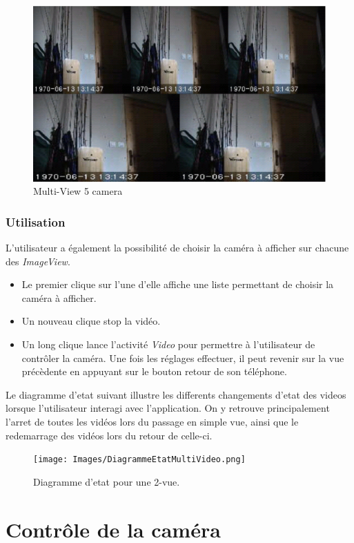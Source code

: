 \begin{figure}[H]
  \label{5cam.eps}
  \centering
   \includegraphics[scale=0.4]{Images/5cam.eps}
  \caption{Multi-View 5 camera}
\end{figure}  
\subsubsection{Utilisation}
L'utilisateur a également la possibilité de choisir la caméra à afficher sur chacune des \textit{ImageView}. 
\begin{itemize}
\item Le premier clique sur l'une d'elle affiche une liste permettant de
choisir la caméra à afficher.
\item Un nouveau clique stop la vidéo.
\item Un long clique lance l'activité \textit{Video} pour permettre à
l'utilisateur de contrôler la caméra. Une fois les réglages effectuer, il peut
revenir sur la vue précèdente en appuyant sur le bouton retour de son téléphone.
\end{itemize}
Le diagramme d'etat suivant illustre les differents changements d'etat des
videos lorsque l'utilisateur interagi avec l'application. On y retrouve
principalement l'arret de toutes les vidéos lors du passage en simple vue, ainsi
que le redemarrage des vidéos lors du retour de celle-ci.
\begin{figure}[H]
  \label{DiagrammeSequenceMultiView}
  \centering
   \texttt{[image: Images/DiagrammeEtatMultiVideo.png]}
  \caption{Diagramme d'etat pour une 2-vue.}
\end{figure}  


\section{Contrôle de la caméra}


